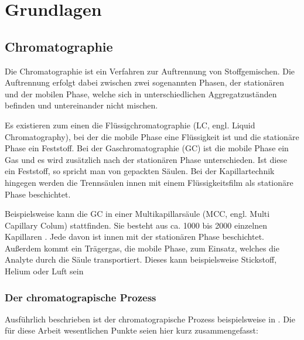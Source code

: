 
\chapter{Grundlagen}
\label{chapter:gru}

\section{Chromatographie}

Die Chromatographie ist ein Verfahren zur Auftrennung von Stoffgemischen. 
Die Auftrennung erfolgt dabei zwischen zwei sogenannten Phasen, der stationären und der mobilen Phase, welche sich in unterschiedlichen Aggregatzuständen befinden und untereinander nicht mischen. 

Es existieren zum einen die Flüssigchromatographie (LC, engl. Liquid Chromatography),
bei der die mobile Phase eine Flüssigkeit ist und die stationäre Phase ein Feststoff. Bei der Gaschromatographie (GC) ist die mobile Phase ein Gas und es wird zusätzlich nach der stationären Phase unterschieden. Ist diese ein Feststoff, so spricht man von gepackten Säulen. Bei der Kapillartechnik hingegen werden die Trennsäulen innen mit einem Flüssigkeitsfilm als stationäre Phase beschichtet.



Beispielsweise kann die GC in einer Multikapillarsäule (MCC, engl. Multi Capillary Colum) stattfinden. Sie besteht aus ca. 1000 bis 2000 einzelnen Kapillaren \cite{obinski1999} \cite{Baumbach2009}. Jede davon ist innen mit der stationären Phase beschichtet. Außerdem kommt ein Trägergas, die mobile Phase, zum Einsatz, welches die Analyte durch die Säule transportiert. Dieses kann beispielsweise Stickstoff, Helium \cite{obinski1999} oder Luft sein \cite{Baumbach2009}

\subsection{Der chromatograpische Prozess}
Ausführlich beschrieben ist der chromatograpische Prozess beispielsweise in \cite{kolb2003}.
Die für diese Arbeit wesentlichen Punkte seien hier kurz zusammengefasst:


